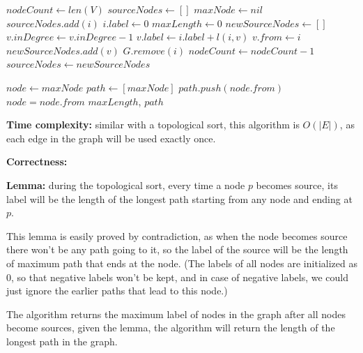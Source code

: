 \documentclass{article}
\begin{document}
\begin{description}
\begin{algorithm}[h]
\begin{algorithmic}[1]
      \State $nodeCount \gets len(V)$
      \State $sourceNodes \gets []$
      \State $maxNode \gets nil$
          \State $sourceNodes.add(i)$
          \State $i.label \gets 0$
        \EndIf
      \EndFor
      \State $maxLength \gets 0$
        \State $newSourceNodes \gets []$
            \State $v.inDegree \gets v.inDegree - 1$
              \State $v.label \gets i.label + l(i,v)$
              \State $v.from \gets i$
            \EndIf
            \EndIf
              \State $newSourceNodes.add(v)$
            \EndIf
          \EndFor
          \State $G.remove(i)$
          \State $nodeCount \gets nodeCount - 1$
        \EndFor
        \State $sourceNodes \gets newSourceNodes$
      \EndWhile

      \State $node \gets maxNode$
      \State $path \gets [maxNode]$
        \State $path.push(node.from)$
        \State $node = node.from$
      \EndWhile
      \State \Return $maxLength$, $path$
    \EndFunction
    
    \end{algorithmic}
  \end{algorithm}

  \textbf{Time complexity:} similar with a topological sort, this algorithm is $O(|E|)$, as each edge in the graph will be used exactly once.

  \textbf{Correctness:} 

  \textbf{Lemma:} during the topological sort, every time a node $p$ becomes source, its label will be the length of the longest path starting from any node and ending at $p$. 

  This lemma is easily proved by contradiction, as when the node becomes source there won't be any path going to it, so the label of the source will be the length of maximum path that ends at the node. (The labels of all nodes are initialized as 0, so that negative labels won't be kept, and in case of negative labels, we could just ignore the earlier paths that lead to this node.)

  The algorithm returns the maximum label of nodes in the graph after all nodes become sources, given the lemma, the algorithm will return the length of the longest path in the graph.


\end{description}
\end{document}
